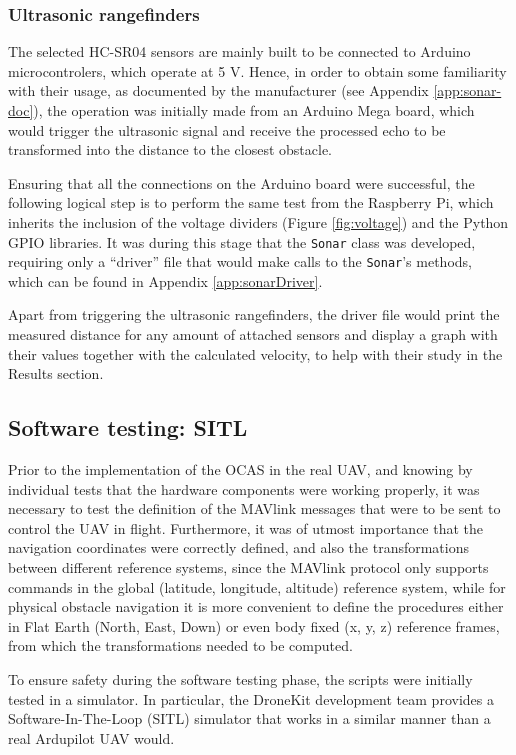 \subsubsection{Ultrasonic rangefinders} \label{sec:sonartest}

The selected HC-SR04 sensors are mainly built to be connected to Arduino microcontrolers, which operate at 5 V.
Hence, in order to obtain some familiarity with their usage, as documented by the manufacturer (see Appendix \ref{app:sonar-doc}), the operation was initially made from an Arduino Mega board, which would trigger the ultrasonic signal and receive the processed echo to be transformed into the distance to the closest obstacle.

Ensuring that all the connections on the Arduino board were successful, the following logical step is to perform the same test from the Raspberry Pi, which inherits the inclusion of the voltage dividers (Figure \ref{fig:voltage}) and the Python GPIO libraries.
It was during this stage that the \texttt{Sonar} class was developed, requiring only a ``driver'' file that would make calls to the \texttt{Sonar}'s methods, which can be found in Appendix \ref{app:sonarDriver}.

Apart from triggering the ultrasonic rangefinders, the driver file would print the measured distance for any amount of attached sensors and display a graph with their values together with the calculated velocity, to help with their study in the Results section.


\subsection{Software testing: SITL}

Prior to the implementation of the OCAS in the real UAV, and knowing by individual tests that the hardware components were working properly, it was necessary to test the definition of the MAVlink messages that were to be sent to control the UAV in flight.
Furthermore, it was of utmost importance that the navigation coordinates were correctly defined, and also the transformations between different reference systems, since the MAVlink protocol only supports commands in the global (latitude, longitude, altitude) reference system, while for physical obstacle navigation it is more convenient to define the procedures either in Flat Earth (North, East, Down) or even body fixed (x, y, z) reference frames, from which the transformations needed to be computed.

To ensure safety during the software testing phase, the scripts were initially tested in a simulator.
In particular, the DroneKit development team provides a Software-In-The-Loop (SITL) simulator that works in a similar manner than a real Ardupilot UAV would.

